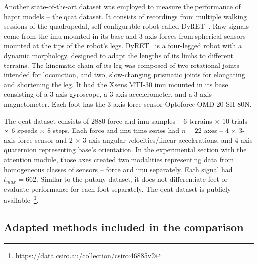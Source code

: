 \documentclass[a4paper, 10pt, twoside]{report}
\begin{document}
Another state-of-the-art dataset was employed to measure the performance of \acrshort{haptr} models -- the \acrshort{qcat} dataset. It consists of recordings from multiple walking sessions of the quadrupedal, self-configurable robot called DyRET~\cite{DyRET}. Raw signals come from the \acrshort{imu} mounted in its base and 3-axis forces from spherical sensors mounted at the tips of the robot's legs. 
DyRET~\cite{DyRET} is a four-legged robot with a dynamic morphology, designed to adapt the lengths of its limbs to different terrains. The kinematic chain of its leg was composed of two rotational joints intended for locomotion, and two, slow-changing prismatic joints for elongating and shortening the leg. It had the Xsens MTI-30 \acrshort{imu} mounted in its base consisting of a 3-axis gyroscope, a 3-axis accelerometer, and a 3-axis magnetometer. Each foot has the 3-axis force sensor Optoforce OMD-20-SH-80N.

The \acrshort{qcat} dataset consists of 2880 force and \acrshort{imu} samples -- 6 terrains $\times$ 10 trials $\times$ 6 speeds $\times$ 8 steps. Each force and \acrshort{imu} time series had $n = 22$ axes -- 4 $\times$ 3-axis force sensor and 2 $\times$ 3-axis angular velocities/linear accelerations, and 4-axis quaternion representing base's orientation. In the experimental section with the attention module, those axes created two modalities representing data from homogeneous classes of sensors  -- force and \acrshort{imu} separately. Each signal had $t_{max} = 662$. Similar to the \acrshort{putany} dataset, it does not differentiate feet or evaluate performance for each foot separately. The \acrshort{qcat} dataset is publicly available~\footnote{\url{https://data.csiro.au/collection/csiro:46885v2}}.

\subsection{Adapted methods included in the comparison}
\label{part:methods:terrain:haptr:models}
\end{document}
